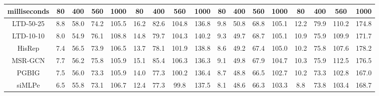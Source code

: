 \documentclass[10pt,twocolumn,letterpaper]{article}
\begin{document}
\begin{table*}[!ht]
{\begin{tabular}{c|cccc|cccc|cccc|cccc}
    milliseconds & 80 & 400 & 560 & 1000 & 80 & 400 & 560 & 1000 & 80 & 400 & 560 & 1000 & 80 & 400 & 560 & 1000 \\ \hline
    LTD-50-25 \cite{mao2019learning}	&8.8 	&58.0 	&74.2 	&105.5 	&16.2 	&82.6 	&104.8 	&136.8 	&9.8 	&50.8 	&68.8 	&105.1 	&12.2 	&79.9 	&110.2 	&174.8 	\\
    LTD-10-10 \cite{mao2019learning}	&8.0 	&54.9 	&76.1 	&108.8 	&14.8 	&79.7 	&104.3 	&140.2 	&9.3 	&49.7 	&68.7 	&105.1 	&10.9 	&75.9 	&109.9 	&171.7 	\\
    HisRep\cite{mao2020history}	&7.4 	&56.5 	&73.9 	&106.5 	&13.7 	&78.1 	&101.9 	&138.8 	&8.6 	&49.2 	&67.4 	&105.0 	&10.2 	&75.8 	&107.6 	&178.2 	\\
    MSR-GCN\cite{dang2021msr}	&7.7 	&56.2 	&75.8 	&105.9 	&15.1 	&85.4 	&106.3 	&136.3 	&9.1 	&49.8 	&67.9 	&104.7 	&10.3 	&75.9 	&112.5 	&176.5 	\\
    PGBIG \cite{ma2022progressively}	&7.5 	&56.0 	&73.3 	&105.9 	&14.0 	&77.3 	&100.2 	&136.4 	&8.7 	&48.8 	&66.5 	&102.7 	&10.2 	&73.3 	&102.8 	&167.0 	\\
    siMLPe \cite{guo2023back}	&6.5 	&55.8 	&73.1 	&106.7 	&12.4 	&77.3 	&99.8 	&137.5 	&8.1 	&48.6 	&66.3 	&103.3 	&8.8 	&73.8 	&103.4 	&168.7 	\\\hline
    

\end{tabular}}
\end{table*}
\end{document}
